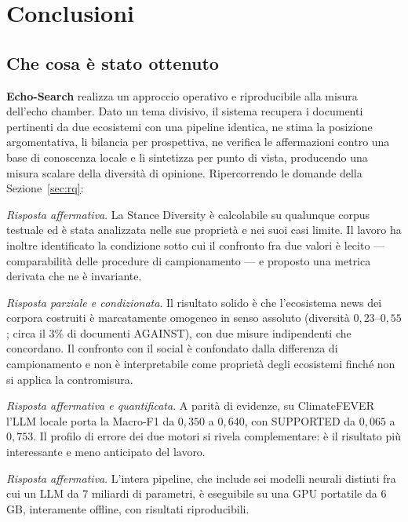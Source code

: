 \documentclass[11pt,a4paper]{report}
\newcommand{\ES}{\textbf{Echo-Search}}
\begin{document}
\chapter{Conclusioni}\label{cap:conclusioni}

\section{Che cosa è stato ottenuto}
\ES{} realizza un approccio operativo e riproducibile alla misura dell'echo chamber. Dato un tema
divisivo, il sistema recupera i documenti pertinenti da due ecosistemi con una pipeline identica,
ne stima la posizione argomentativa, li bilancia per prospettiva, ne verifica le affermazioni
contro una base di conoscenza locale e li sintetizza per punto di vista, producendo una misura
scalare della diversità di opinione. Ripercorrendo le domande della Sezione~\ref{sec:rq}:

\begin{description}[leftmargin=1.3cm,style=nextline]
  \item[RQ1 (misurabilità)] \emph{Risposta affermativa}. La Stance Diversity è calcolabile su
        qualunque corpus testuale ed è stata analizzata nelle sue proprietà e nei suoi casi limite.
        Il lavoro ha inoltre identificato la condizione sotto cui il confronto fra due valori è
        lecito --- comparabilità delle procedure di campionamento --- e proposto una metrica
        derivata che ne è invariante.
  \item[RQ2 (confronto fra ecosistemi)] \emph{Risposta parziale e condizionata}. Il risultato solido
        è che l'ecosistema news dei corpora costruiti è marcatamente omogeneo in senso assoluto
        (diversità $0{,}23$--$0{,}55$; circa il $3\%$ di documenti AGAINST), con due misure
        indipendenti che concordano. Il confronto con il social è confondato dalla differenza di
        campionamento e non è interpretabile come proprietà degli ecosistemi finché non si applica la
        contromisura.
  \item[RQ3 (motore di verdetto)] \emph{Risposta affermativa e quantificata}. A parità di evidenze,
        su ClimateFEVER l'LLM locale porta la Macro-F1 da $0{,}350$ a $0{,}640$, con SUPPORTED da
        $0{,}065$ a $0{,}753$. Il profilo di errore dei due motori si rivela complementare: è il
        risultato più interessante e meno anticipato del lavoro.
  \item[RQ4 (fattibilità)] \emph{Risposta affermativa}. L'intera pipeline, che include sei modelli
        neurali distinti fra cui un LLM da 7 miliardi di parametri, è eseguibile su una GPU
        portatile da 6\,GB, interamente offline, con risultati riproducibili.
\end{description}
\end{document}
